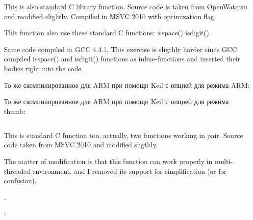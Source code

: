 {This is also standard C library function. Source code is taken from OpenWatcom and modified slightly.
Compiled in MSVC 2010 with \Ox optimization flag.}

{This function also use these standard C functions:} isspace() \AndENRU isdigit().



{Same code compiled in GCC 4.4.1. This exercise is sligthly harder since GCC compiled isspace() and isdigit()
functions as inline-functions and inserted their bodies right into the code.}



То же скомпилированное для ARM при помощи Keil с опцией \Othree для режима ARM:



То же скомпилированное для ARM при помощи Keil с опцией \Othree для режима thumb:



\subsection{}

{This is standard C function too, actually, two functions working in pair.
Source code taken from MSVC 2010 and modified sligthly.}

{The matter of modification is that this function can work properly in multi-threaded environment,
and I removed its support for simplification (or for confusion).}

.



:

